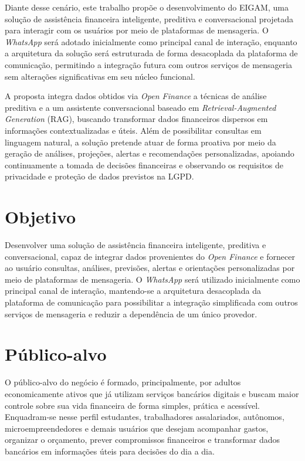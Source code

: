 Diante desse cenário, este trabalho propõe o desenvolvimento do EIGAM, uma solução de assistência financeira inteligente, preditiva e conversacional projetada para interagir com os usuários por meio de plataformas de mensageria. O \textit{WhatsApp} será adotado inicialmente como principal canal de interação, enquanto a arquitetura da solução será estruturada de forma desacoplada da plataforma de comunicação, permitindo a integração futura com outros serviços de mensageria sem alterações significativas em seu núcleo funcional.

A proposta integra dados obtidos via \textit{Open Finance} a técnicas de análise preditiva e a um assistente conversacional baseado em \textit{Retrieval-Augmented Generation} (RAG), buscando transformar dados financeiros dispersos em informações contextualizadas e úteis. Além de possibilitar consultas em linguagem natural, a solução pretende atuar de forma proativa por meio da geração de análises, projeções, alertas e recomendações personalizadas, apoiando continuamente a tomada de decisões financeiras e observando os requisitos de privacidade e proteção de dados previstos na LGPD.


\section{Objetivo}

Desenvolver uma solução de assistência financeira inteligente, preditiva e conversacional, capaz de integrar dados provenientes do \textit{Open Finance} e fornecer ao usuário consultas, análises, previsões, alertas e orientações personalizadas por meio de plataformas de mensageria. O \textit{WhatsApp} será utilizado inicialmente como principal canal de interação, mantendo-se a arquitetura desacoplada da plataforma de comunicação para possibilitar a integração simplificada com outros serviços de mensageria e reduzir a dependência de um único provedor.


\section{Público-alvo}

O público-alvo do negócio é formado, principalmente, por adultos economicamente ativos que já utilizam serviços bancários digitais e buscam maior controle sobre sua vida financeira de forma simples, prática e acessível. Enquadram-se nesse perfil estudantes, trabalhadores assalariados, autônomos, microempreendedores e demais usuários que desejam acompanhar gastos, organizar o orçamento, prever compromissos financeiros e transformar dados bancários em informações úteis para decisões do dia a dia.

